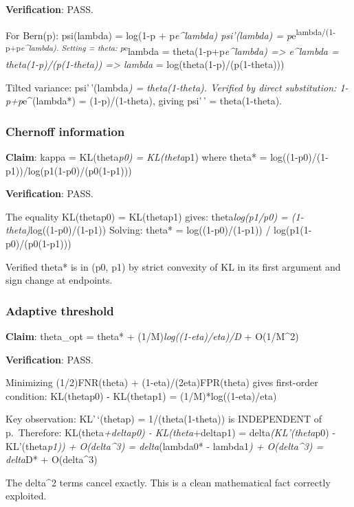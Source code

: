 \documentclass[
  12pt,
]{article}
\begin{document}
\textbf{Verification}: PASS.

For Bern(p): psi(lambda) = log(1-p + p\emph{e\^{}lambda) psi'(lambda) =
p}e\textsuperscript{lambda/(1-p+p\emph{e\^{}lambda). Setting = theta:
p}e}lambda = theta(1-p+p\emph{e\^{}lambda) =\textgreater{} e\^{}lambda =
theta(1-p)/(p(1-theta)) =\textgreater{} lambda} =
log(theta(1-p)/(p(1-theta)))

Tilted variance: psi'\,'(lambda\emph{) = theta(1-theta). Verified by
direct substitution: 1-p+p}e\^{}(lambda*) = (1-p)/(1-theta), giving
psi'\,' = theta(1-theta).

\subsubsection{Chernoff information}\label{chernoff-information}

\textbf{Claim}: kappa = KL(theta\emph{\textbar\textbar p0) =
KL(theta}\textbar\textbar p1) where theta* =
log((1-p0)/(1-p1))/log(p1(1-p0)/(p0(1-p1)))

\textbf{Verification}: PASS.

The equality KL(theta\textbar\textbar p0) = KL(theta\textbar\textbar p1)
gives: theta\emph{log(p1/p0) = (1-theta)}log((1-p0)/(1-p1)) Solving:
theta* = log((1-p0)/(1-p1)) / log(p1(1-p0)/(p0(1-p1)))

Verified theta* is in (p0, p1) by strict convexity of KL in its first
argument and sign change at endpoints.

\subsubsection{Adaptive threshold}\label{adaptive-threshold}

\textbf{Claim}: theta\_opt = theta* + (1/M)\emph{log((1-eta)/eta)/D} +
O(1/M\^{}2)

\textbf{Verification}: PASS.

Minimizing (1/2)FNR(theta) + (1-eta)/(2eta)FPR(theta) gives first-order
condition: KL(theta\textbar\textbar p0) - KL(theta\textbar\textbar p1) =
(1/M)*log((1-eta)/eta)

Key observation: KL'\,`(theta\textbar\textbar p) = 1/(theta(1-theta)) is
INDEPENDENT of p.~Therefore: KL(theta\emph{+delta\textbar\textbar p0) -
KL(theta}+delta\textbar\textbar p1) =
delta\emph{(KL'(theta}\textbar\textbar p0) -
KL'(theta\emph{\textbar\textbar p1)) + O(delta\^{}3) = delta}(lambda0* -
lambda1\emph{) + O(delta\^{}3) = delta}D* + O(delta\^{}3)

The delta\^{}2 terms cancel exactly. This is a clean mathematical fact
correctly exploited.
\end{document}
